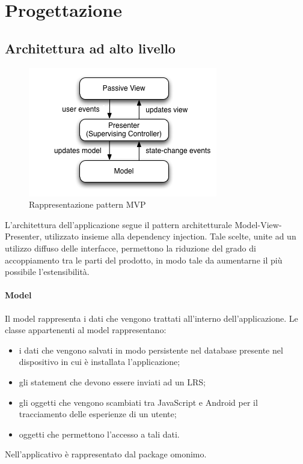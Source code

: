\documentclass[../Tesi.tex]{subfiles}
\begin{document}
\section{Progettazione}
	\subsection{Architettura ad alto livello}
		\begin{figure}[!h]
			\centering
			\includegraphics[scale=0.6]{images/mvp}
				\caption{Rappresentazione pattern MVP}
		\end{figure}

		L'architettura dell'applicazione segue il pattern architetturale Model-View-Presenter, utilizzato insieme alla dependency injection. Tale scelte, unite ad un utilizzo diffuso delle interfacce, permettono la riduzione del grado di accoppiamento tra le parti del prodotto, in modo tale da aumentarne il più possibile l'estensibilità.

		\paragraph*{Model}
		Il model rappresenta i dati che vengono trattati all'interno dell'applicazione. Le classe appartenenti al model rappresentano:
		\begin{itemize}
			\item i dati che vengono salvati in modo persistente nel database presente nel dispositivo in cui è installata l'applicazione;
			\item gli statement che devono essere inviati ad un LRS;
			\item gli oggetti che vengono scambiati tra JavaScript e Android per il tracciamento delle esperienze di un utente;
			\item oggetti che permettono l'accesso a tali dati.
		\end{itemize}
		Nell'applicativo è rappresentato dal package omonimo.
\end{document}
